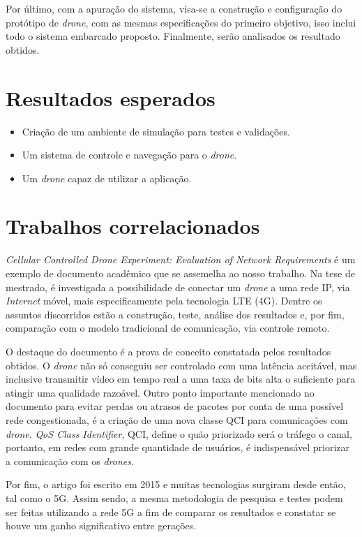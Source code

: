 \documentclass[12pt,a4paper,oneside]{book}
\begin{document}
Por último, com a apuração do sistema, visa-se a construção e configuração do protótipo de \textit{drone}, com as mesmas especificações do primeiro objetivo, isso inclui todo o sistema embarcado proposto. Finalmente, serão analisados os resultado obtidos.  

\section{Resultados esperados}

\begin{itemize}
\item Criação de um ambiente de simulação para testes e validações.
\item Um sistema de controle e navegação para o \textit{drone}.
\item Um \textit{drone} capaz de utilizar a aplicação.     
\end{itemize}

\section{Trabalhos correlacionados}

\textit{Cellular Controlled Drone Experiment: Evaluation of Network Requirements}\cite{artigo_relacionado_1} é um exemplo de documento acadêmico que se assemelha ao nosso trabalho. Na tese de mestrado, é investigada a possibilidade de conectar um \textit{drone} a uma rede IP, via \textit{Internet} móvel, mais especificamente pela tecnologia LTE (4G). Dentre os assuntos discorridos estão a construção, teste, análise dos resultados e, por fim, comparação com o modelo tradicional de comunicação, via controle remoto. 

O destaque do documento é a prova de conceito constatada pelos resultados obtidos. O \textit{drone} não só conseguiu ser controlado com uma latência aceitável, mas inclusive transmitir vídeo em tempo real a uma taxa de bits alta o suficiente para atingir uma qualidade razoável. Outro ponto importante mencionado no documento para evitar perdas ou atrasos de pacotes por conta de uma possível rede congestionada, é a criação de uma nova classe QCI para comunicações com \textit{drone}. \textit{QoS Class Identifier}, QCI, define o quão priorizado será o tráfego o canal, portanto, em redes com grande quantidade de usuários, é indispensável priorizar a comunicação com os \textit{drones}. 

Por fim, o artigo foi escrito em 2015 e muitas tecnologias surgiram desde então, tal como o 5G. Assim sendo, a mesma metodologia de pesquisa e testes podem ser feitas utilizando a rede 5G a fim de comparar os resultados e constatar se houve um ganho significativo entre gerações.
\end{document}
